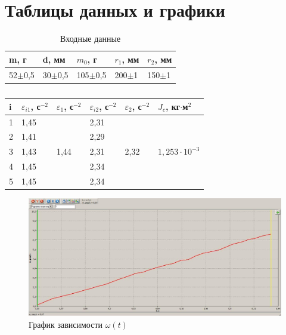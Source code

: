 \documentclass[12pt]{article}
\begin{document}
	\section{Таблицы данных и графики}
	\begin{table}[H]
		\centering
		\caption{Входные данные}
		\begin{tabular}{|l|l|l|l|l|}
			\hline
			m, г       & d, мм      & $m_0$, г    & $r_1$, мм & $r_2$, мм \\ \hline
			52$\pm$0,5 & 30$\pm$0,5 & 105$\pm$0,5 & 200$\pm$1 & 150$\pm$1 \\ \hline
		\end{tabular}
	\end{table}
	\begin{table}[H]
		\centering
		\caption{}
		\begin{tabular}{|l|l|l|l|l|l|}
			\hline
			i & $\varepsilon_{i1}$, с$^{-2}$ & $\varepsilon_{1}$, с$^{-2}$ & $\varepsilon_{i2}$, с$^{-2}$ & $\varepsilon_{2}$, с$^{-2}$ & $J_c$, кг$\cdot$м$^2$ \\ \hline
			1 & 1,45                       &                           & 2,31                       &                           &                       \\ \cline{1-2} \cline{4-4}
			2 & 1,41                       &                           & 2,29                       &                           &                       \\ \cline{1-2} \cline{4-4}
			3 & 1,43                       & 1,44                      & 2,31                       & 2,32                      & $1{,}253\cdot10^{-3}$  \\ \cline{1-2} \cline{4-4}
			4 & 1,45                       &                           & 2,34                       &                           &                       \\ \cline{1-2} \cline{4-4}
			5 & 1,45                       &                           & 2,34                       &                           &                       \\ \hline
		\end{tabular}
	\end{table}
	\begin{figure}[H]
		\centering
		\includegraphics[scale=0.45]{graph1}
		\caption{График зависимости $\omega(t)$}
	\end{figure}
\end{document}
